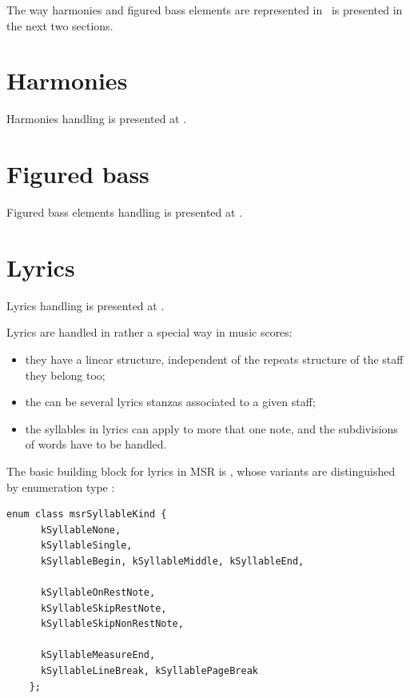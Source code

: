 The way harmonies and figured bass elements are represented in \mf\ is presented in the next two sections.


\section{Harmonies}\label{Harmonies}

Harmonies handling is presented at .


\section{Figured bass}\label{Figured bass}

Figured bass elements handling is presented at .


\section{Lyrics}\label{Lyrics}

Lyrics handling is presented at .

Lyrics are handled in rather a special way in music scores:
\begin{itemize}
\item they have a linear structure, independent of the repeats structure of the staff they belong too;
\item the can be several lyrics stanzas associated to a given staff;
\item the syllables in lyrics can apply to more that one note, and the subdivisions of words have to be handled.
\end{itemize}

The basic building block for lyrics in MSR is , whose variants are distinguished by enumeration type :
\begin{lstlisting}[language=CPlusPlus]
    enum class msrSyllableKind {
      kSyllableNone,
      kSyllableSingle,
      kSyllableBegin, kSyllableMiddle, kSyllableEnd,

      kSyllableOnRestNote,
      kSyllableSkipRestNote,
      kSyllableSkipNonRestNote,

      kSyllableMeasureEnd,
      kSyllableLineBreak, kSyllablePageBreak
    };
\end{lstlisting}

